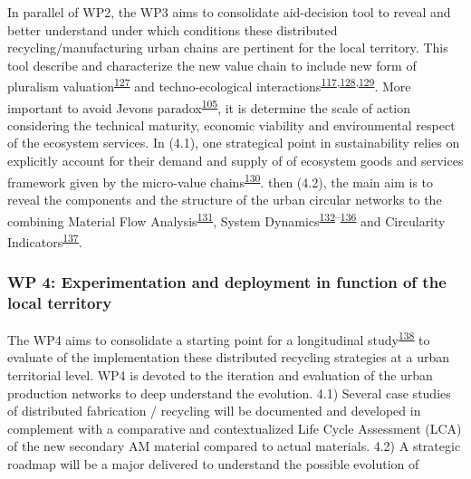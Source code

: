 \documentclass[
  12pt,
  a4paperpaper,
  onecolumn]{article}
\begin{document}
In parallel of WP2, the WP3 aims to consolidate aid-decision tool to
reveal and better understand under which conditions these distributed
recycling/manufacturing urban chains are pertinent for the local
territory. This tool describe and characterize the new value chain to
include new form of pluralism
valuation\textsuperscript{\protect\hyperlink{ref-gunton2022}{127}} and
techno-ecological
interactions\textsuperscript{\protect\hyperlink{ref-Saladini2018}{117},\protect\hyperlink{ref-Liu2020c}{128},\protect\hyperlink{ref-Liu2019g}{129}}.
More important to avoid Jevons
paradox\textsuperscript{\protect\hyperlink{ref-giampietro2018}{105}}, it
is determine the scale of action considering the technical maturity,
economic viability and environmental respect of the ecosystem services.
In (4.1), one strategical point in sustainability relies on explicitly
account for their demand and supply of of ecosystem goods and services
framework given by the micro-value
chains\textsuperscript{\protect\hyperlink{ref-Diwekar2021}{130}}. then
(4.2), the main aim is to reveal the components and the structure of the
urban circular networks to the combining Material Flow
Analysis\textsuperscript{\protect\hyperlink{ref-saidani2021}{131}},
System
Dynamics\textsuperscript{\protect\hyperlink{ref-kuo2021}{132}--\protect\hyperlink{ref-perez-perez2021}{136}}
and Circularity
Indicators\textsuperscript{\protect\hyperlink{ref-saidani2019}{137}}.

\hypertarget{wp-4-experimentation-and-deployment-in-function-of-the-local-territory}{%
\subsubsection{WP 4: Experimentation and deployment in function of the
local
territory}\label{wp-4-experimentation-and-deployment-in-function-of-the-local-territory}}

The WP4 aims to consolidate a starting point for a longitudinal
study\textsuperscript{\protect\hyperlink{ref-langley2013}{138}} to
evaluate of the implementation these distributed recycling strategies at
a urban territorial level. WP4 is devoted to the iteration and
evaluation of the urban production networks to deep understand the
evolution. 4.1) Several case studies of distributed fabrication /
recycling will be documented and developed in complement with a
comparative and contextualized Life Cycle Assessment (LCA) of the new
secondary AM material compared to actual materials. 4.2) A strategic
roadmap will be a major delivered to understand the possible evolution
of
\end{document}
